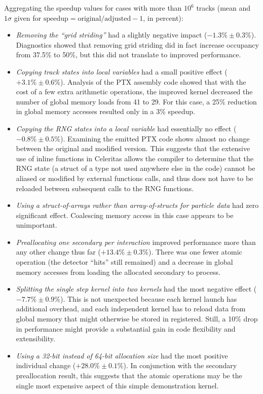\documentclass{webofc}
\begin{document}
Aggregating the speedup values for cases with more than $10^6$ tracks (mean and
$1\sigma$ given for $\mbox{speedup}=\mbox{original}/\mbox{adjusted} - 1$, in
percent):
\begin{itemize}
  \item \emph{Removing the ``grid striding''} had a slightly negative impact
    ($-1.3\% \pm 0.3\%$). Diagnostics showed
    that removing grid striding did in fact increase occupancy from 37.5\% to
    50\%, but this did not translate to improved performance.
  \item \emph{Copying track states into local variables} had a small positive
    effect ($+3.1\% \pm 0.6\%$). Analysis of the PTX assembly code showed that
    with the cost of a few extra arithmetic operations, the improved kernel
    decreased the number of global memory loads from 41 to 29. For this case, a
    25\% reduction in global memory accesses resulted only in a 3\% speedup.
  \item \emph{Copying the RNG states into a local variable} had essentially no effect
    ($-0.8\% \pm 0.5\%$). Examining the emitted PTX code shows almost no change
    between the original and modified version. This suggests that the extensive
    use of inline functions in Celeritas allows the compiler to determine that
    the RNG state (a struct of a type not used anywhere else in the code) cannot
    be aliased or modified by external functions calls, and thus does not have
    to be reloaded between subsequent calls to the RNG functions.
  \item \emph{Using a struct-of-arrays rather than array-of-structs for particle
    data} had zero significant effect. Coalescing memory access in this case
    appears to be unimportant.
  \item \emph{Preallocating one secondary per interaction} improved performance
    more than any other change thus far ($+13.4\% \pm 0.3\%$). There was one
    fewer atomic operation (the detector ``hits'' still remained) and a decrease
    in global
    memory accesses from loading the allocated secondary to process.
  \item \emph{Splitting the single step kernel into two kernels} had the most
    negative effect ($-7.7\% \pm 0.9\%$). This is not unexpected because each
    kernel launch has additional overhead, and each independent kernel has to
    reload data from global memory that might otherwise be stored in registered.
    Still, a 10\% drop in performance might provide a substantial gain in code
    flexibility and extensibility.
  \item \emph{Using a 32-bit instead of 64-bit allocation size} had the most
    positive individual change ($+28.0\% \pm 0.1\%$). In conjunction with the
    secondary preallocation result, this suggests that the atomic operations may
    be the single most expensive aspect of this simple demonstration kernel.
\end{itemize}
\end{document}
